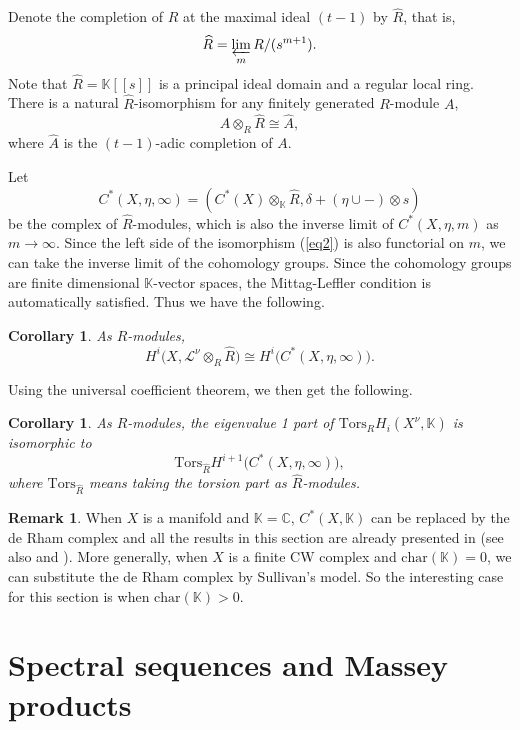 \documentclass[12pt,leqno,twoside]{amsart}
\theoremstyle{plain}
\newtheorem{cor}[theorem]{Corollary}
\theoremstyle{definition}
\newtheorem{remark}[theorem]{Remark}
\newcommand{\C}{\mathbb{C}}
\newcommand{\K}{\mathbb{K}}
\newcommand{\Tors}{\mathrm{Tors}}
\newcommand{\sL}{\mathcal{L}}
\begin{document}
Denote the completion of $R$ at the maximal ideal $(t-1)$ by $\widehat{R}$, that is, $$\widehat{R}=\displaystyle\varprojlim_m R/(s^{m+1}).$$ Note that $\widehat{R}= \K[[s]]$ is a principal ideal domain and a regular local ring. There is a natural $\widehat{R}$-isomorphism for any finitely generated $R$-module $A$,
$$ A \otimes_R \widehat{R} \cong \widehat{A},$$ 
where $\widehat{A}$ is the $(t-1)$-adic completion of $A$.
  

Let
\[
C^*(X, \eta, \infty)=\left(C^*(X)\otimes_{\K} \widehat{R}, \delta +(\eta \cup -)\otimes s\right)
\]
be the complex of $\widehat{R}$-modules, which is also the inverse limit of $C^*(X, \eta, m)$ as $m\to \infty$. 
Since the left side of the isomorphism (\ref{eq2}) is also functorial on $m$, we can take the inverse limit of the cohomology groups. Since the cohomology groups are finite dimensional $\K$-vector spaces, the Mittag-Leffler condition is automatically satisfied. Thus we have the following. 
\begin{cor} \label{hat} As $\widehat{R}$-modules,
$$H^i\big(X,\sL^\nu\otimes_R \widehat{R}\big)\cong H^i\big(C^*(X, \eta, \infty)\big).$$
\end{cor}

Using the universal coefficient theorem, we then get the following.
\begin{cor}\label{cor cochain algebra}  As $\widehat{R}$-modules, the eigenvalue 1 part of 
  $\Tors_{{R}} H_i(X^\nu,\K)$ is isomorphic to
  $$\Tors_{\widehat{R}} H^{i+1}\big(C^*(X, \eta, \infty)\big),$$
where $\Tors_{\widehat{R}}$ means taking the torsion part as $\widehat{R}$-modules. 
\end{cor}


\begin{remark}
When $X$ is a manifold and $\K=\C$, $C^*(X,\K)$ can be replaced by the de Rham complex and all the results in this section are already presented in \cite[Section 3]{BLW} (see also \cite{DP} and \cite{BW15B}). More generally, when $X$ is a finite CW complex and $\mathrm{char}(\K)=0$, we can substitute the de Rham complex by Sullivan's model. So the interesting case for this section is when $\mathrm{char}(\K)>0$.  
\end{remark}


\section{Spectral sequences and Massey products}
\end{document}
